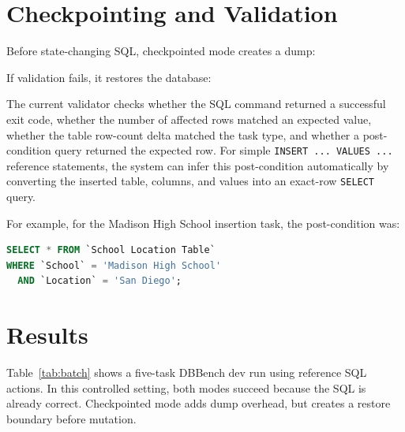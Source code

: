 \documentclass[10pt,twocolumn]{article}
\begin{document}
\section{Checkpointing and Validation}

Before state-changing SQL, checkpointed mode creates a dump:

\noindent{}

If validation fails, it restores the database:

\noindent{}

The current validator checks whether the SQL command returned a successful exit code, whether the number of affected rows matched an expected value, whether the table row-count delta matched the task type, and whether a post-condition query returned the expected row. For simple \texttt{INSERT ... VALUES ...} reference statements, the system can infer this post-condition automatically by converting the inserted table, columns, and values into an exact-row \texttt{SELECT} query.

For example, for the Madison High School insertion task, the post-condition was:

\begin{lstlisting}[language=SQL]
SELECT * FROM `School Location Table`
WHERE `School` = 'Madison High School'
  AND `Location` = 'San Diego';
\end{lstlisting}

\section{Results}

Table~\ref{tab:batch} shows a five-task DBBench dev run using reference SQL actions. In this controlled setting, both modes succeed because the SQL is already correct. Checkpointed mode adds dump overhead, but creates a restore boundary before mutation.
\end{document}
